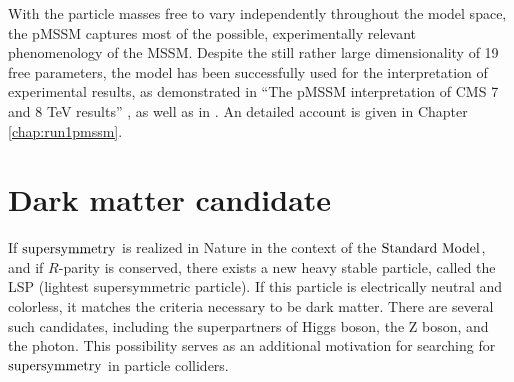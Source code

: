 With the particle masses free to vary independently throughout the model space, the pMSSM captures most of the possible, experimentally relevant phenomenology of the MSSM.  Despite the still rather large dimensionality of 19 free parameters, the model has been successfully used for the interpretation of experimental results, as demonstrated in ``The pMSSM interpretation of CMS 7 and 8 TeV results'' \cite{Khachatryan:2016nvf}, as well as in \cite{Carena:2012he, Aad:2015baa}. An detailed account is given in Chapter \ref{chap:run1pmssm}.

\section{Dark matter candidate}
If $\text{supersymmetry}$ is realized in Nature in the context of the $\text{Standard\ Model}$, and if $R$-parity is conserved, there exists a new heavy stable particle, called the LSP (lightest supersymmetric particle). If this particle is electrically neutral and colorless, it matches the criteria necessary to be dark matter. There are several such candidates, including the superpartners of Higgs boson, the Z boson, and the photon. This possibility serves as an additional motivation for searching for $\text{supersymmetry}$ in particle colliders. 
